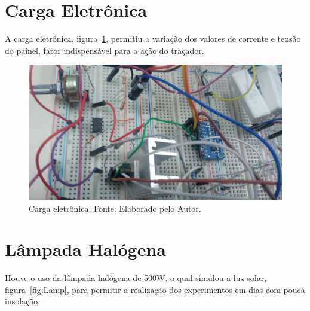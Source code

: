 \section{Carga Eletrônica}
A carga eletrônica, figura~\ref{fig:Carga}, permitiu a variação dos valores de corrente e tensão do painel, fator indispensável para a ação do traçador.

\FloatBarrier
\begin{figure}[!htbp]
	\centering
	\includegraphics[scale=0.3]{imagens/CargaEletronica.png}
	\caption{Carga eletrônica. Fonte: Elaborado pelo Autor. 	}
	\label{fig:Carga}
\end{figure}
\FloatBarrier

\section{Lâmpada Halógena}
Houve o uso da lâmpada halógena de 500W, o qual simulou a luz solar, figura~\ref{fig:Lamp}, para permitir a realização dos experimentos em dias com pouca insolação.

